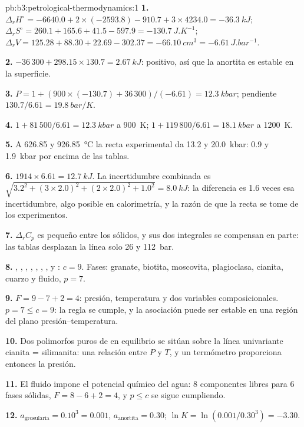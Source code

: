 \begin{solution}{pb:b3:petrological-thermodynamics:1}
\textbf{1.} $\Delta_rH^\circ = -6640.0 + 2\times(-2593.8) - 910.7 + 3\times4234.0
= \qty{-36.3}{kJ}$; $\Delta_rS^\circ = 260.1 + 165.6 + 41.5 - 597.9 =
\qty{-130.7}{J.K^{-1}}$; $\Delta_rV = 125.28 + 88.30 + 22.69 - 302.37 =
\qty{-66.10}{cm^3} = \qty{-6.61}{J.bar^{-1}}$.

\textbf{2.} $-36\,300 + 298.15\times130.7 = \qty{+2.67}{kJ}$: positivo, así que
la anortita es estable en la superficie.

\textbf{3.} $P = 1 + (900\times(-130.7) + 36\,300)/(-6.61) = \qty{12.3}{kbar}$;
pendiente $130.7/6.61 = \qty{19.8}{bar/K}$.

\textbf{4.} $1 + 81\,500/6.61 = \qty{12.3}{kbar}$ a \qty{900}{K}; $1 +
119\,800/6.61 = \qty{18.1}{kbar}$ a \qty{1200}{K}.

\textbf{5.} A 626.85 y \qty{926.85}{\celsius} la recta experimental da
13.2 y \qty{20.0}{kbar}: 0.9 y \qty{1.9}{kbar} por encima de las tablas.

\textbf{6.} $1914\times6.61 = \qty{12.7}{kJ}$. La incertidumbre combinada es
$\sqrt{3.2^2 + (3\times2.0)^2 + (2\times2.0)^2 + 1.0^2} = \qty{8.0}{kJ}$: la
diferencia es 1.6 veces esa incertidumbre, algo posible en calorimetría, y la razón de que la recta
se tome de los experimentos.

\textbf{7.} $\Delta_rC_p$ es pequeño entre los sólidos, y sus dos integrales
se compensan en parte: las tablas desplazan la línea solo 26 y \qty{112}{bar}.

\textbf{8.} , , , , , ,
,  y : $c = 9$. Fases: granate, biotita,
moscovita, plagioclasa, cianita, cuarzo y fluido, $p = 7$.

\textbf{9.} $F = 9 - 7 + 2 = 4$: presión, temperatura y dos
variables composicionales. $p = 7 \le c = 9$: la regla se cumple, y la asociación puede ser estable
en una región del plano presión--temperatura.

\textbf{10.} Dos polimorfos puros de  en equilibrio se sitúan sobre la
línea univariante cianita = silimanita: una relación entre $P$ y $T$, y un
termómetro proporciona entonces la presión.

\textbf{11.} El fluido impone el potencial químico del agua: 8 componentes libres
para 6 fases sólidas, $F = 8 - 6 + 2 = 4$, y $p \le c$ se sigue
cumpliendo.

\textbf{12.} $a_{\text{grosularia}} = 0.10^3 = 0.001$, $a_{\text{anortita}} =
0.30$; $\ln K = \ln(0.001/0.30^3) = -3.30$.


\end{solution}
